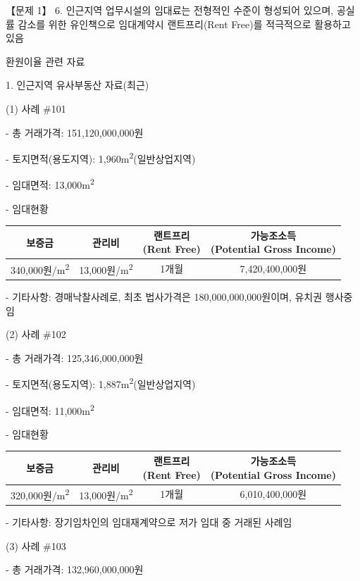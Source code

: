 \begin{longquestion}{【문제 1】}
6. 인근지역 업무시설의 임대료는 전형적인 수준이 형성되어 있으며, 공실률 감소를 위한 유인책으로 임대계약시 랜트프리(Rent Free)를 적극적으로 활용하고 있음 \par
\medskip{} 환원이율 관련 자료 \par
1. 인근지역 유사부동산 자료(최근) \par
(1) 사례 \#101 \par
- 총 거래가격: 151,120,000,000원 \par
- 토지면적(용도지역): 1,960m\textsuperscript{2}(일반상업지역) \par
- 임대면적: 13,000m\textsuperscript{2} \par
- 임대현황 \par
{\small\centering
\begin{tabular}{|c|c|c|c|}\hline
보증금 & 관리비 & \makecell{랜트프리\\(Rent Free)} & \makecell{가능조소득\\(Potential Gross Income)} \\\hline
340,000원/m\textsuperscript{2} & 13,000원/m\textsuperscript{2} & 1개월 & 7,420,400,000원 \\\hline
\end{tabular}\par}
- 기타사항: 경매낙찰사례로, 최초 법사가격은 180,000,000,000원이며, 유치권 행사중임 \par
(2) 사례 \#102 \par
- 총 거래가격: 125,346,000,000원 \par
- 토지면적(용도지역): 1,887m\textsuperscript{2}(일반상업지역) \par
- 임대면적: 11,000m\textsuperscript{2} \par
- 임대현황 \par
{\small\centering
\begin{tabular}{|c|c|c|c|}\hline
보증금 & 관리비 & \makecell{랜트프리\\(Rent Free)} & \makecell{가능조소득\\(Potential Gross Income)} \\\hline
320,000원/m\textsuperscript{2} & 13,000원/m\textsuperscript{2} & 1개월 & 6,010,400,000원 \\\hline
\end{tabular}\par}
- 기타사항: 장기임차인의 임대재계약으로 저가 임대 중 거래된 사례임 \par
(3) 사례 \#103 \par
- 총 거래가격: 132,960,000,000원 \par

\end{longquestion}
